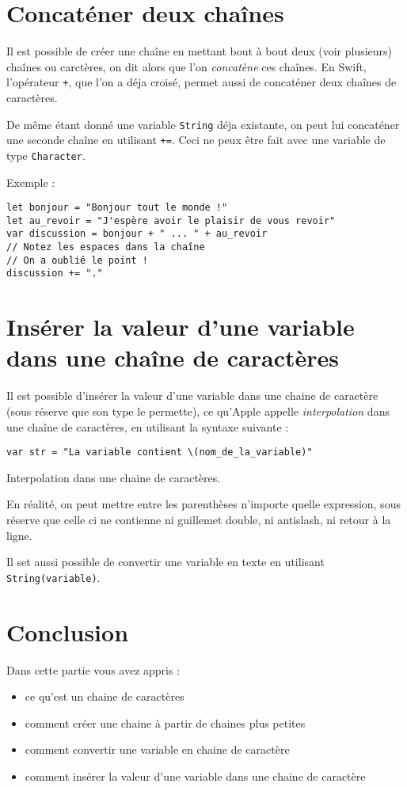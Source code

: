 \section{Concaténer deux chaînes}
Il est possible de créer une chaîne en mettant bout à bout deux (voir plusieurs) chaînes ou carctères, on dit alors que l'on \emph{concatène} ces chaînes. En Swift, l'opérateur \verb"+", que l'on a déja croisé, permet aussi de concaténer deux chaînes de caractères.

De même étant donné une variable \texttt{String} déja existante, on peut lui concaténer une seconde chaîne en utilisant \verb"+=".
Ceci ne peux être fait avec une variable de type \texttt{Character}.

Exemple :
\begin{listing}[h]
\begin{verbatim}
let bonjour = "Bonjour tout le monde !"
let au_revoir = "J'espère avoir le plaisir de vous revoir"
var discussion = bonjour + " ... " + au_revoir
// Notez les espaces dans la chaîne
// On a oublié le point !
discussion += "."
\end{verbatim}
\end{listing}
\section{Insérer la valeur d'une variable dans une chaîne de caractères}
Il est possible d'insérer la valeur d'une variable dans une chaine de caractère (sous réserve que son type le permette), ce qu'Apple appelle \emph{interpolation} dans une chaîne de caractères, en utilisant la syntaxe suivante :
\begin{listing}[h]
\begin{verbatim}
var str = "La variable contient \(nom_de_la_variable)"
\end{verbatim}
\caption{Interpolation dans une chaine de caractères.}
\end{listing}%

En réalité, on peut mettre entre les parenthèses n'importe quelle expression, sous réserve que celle ci ne contienne ni guillemet double, ni antislash, ni retour à la ligne.

Il set aussi possible de convertir une variable en texte en utilisant \texttt{String(variable)}.

\section*{Conclusion}
{}
Dans cette partie vous avez appris :
\begin{itemize}
\item ce qu'est un chaine de caractères
\item comment créer une chaine à partir de chaines plus petites
\item comment convertir une variable en chaine de caractère
\item comment insérer la valeur d'une variable dans une chaine de caractère
\end{itemize}
